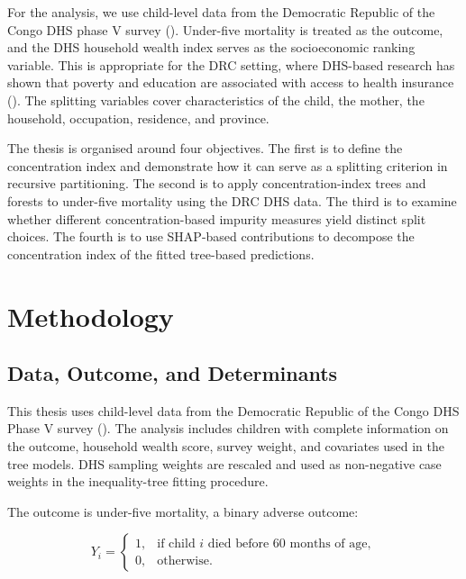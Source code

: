 \documentclass[
  11pt,
  a4paper,
]{article}
\begin{document}
For the analysis, we use child-level data from the Democratic Republic
of the Congo DHS phase V survey (). Under-five mortality is treated as the
outcome, and the DHS household wealth index serves as the socioeconomic
ranking variable. This is appropriate for the DRC setting, where
DHS-based research has shown that poverty and education are associated
with access to health insurance
(). The splitting variables cover
characteristics of the child, the mother, the household, occupation,
residence, and province.

The thesis is organised around four objectives. The first is to define
the concentration index and demonstrate how it can serve as a splitting
criterion in recursive partitioning. The second is to apply
concentration-index trees and forests to under-five mortality using the
DRC DHS data. The third is to examine whether different
concentration-based impurity measures yield distinct split choices. The
fourth is to use SHAP-based contributions to decompose the concentration
index of the fitted tree-based predictions.

\section{Methodology}\label{sec-methodology}

\subsection{Data, Outcome, and
Determinants}\label{sec-data-outcome-determinants}

This thesis uses child-level data from the Democratic Republic of the
Congo DHS Phase V survey (). The analysis includes children with complete
information on the outcome, household wealth score, survey weight, and
covariates used in the tree models. DHS sampling weights are rescaled
and used as non-negative case weights in the inequality-tree fitting
procedure.

The outcome is under-five mortality, a binary adverse outcome:

\[
Y_i =
\begin{cases}
1, & \text{if child } i \text{ died before 60 months of age},\\
0, & \text{otherwise}.
\end{cases}
\]
\end{document}
